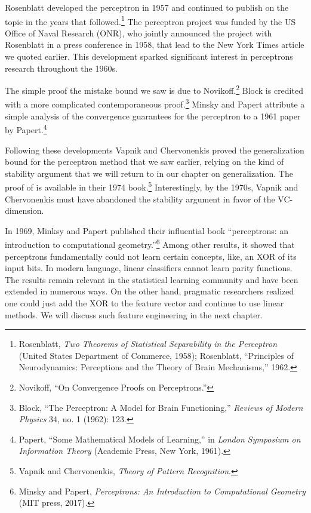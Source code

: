 \documentclass{tufte-book}
\begin{document}
Rosenblatt developed the perceptron in 1957 and continued to publish on
the topic in the years that followed.\footnote{Rosenblatt, \emph{Two
  Theorems of Statistical Separability in the Perceptron} (United States
  Department of Commerce, 1958); Rosenblatt, {``Principles of
  Neurodynamics: Perceptions and the Theory of Brain Mechanisms,''}
  1962.} The perceptron project was funded by the US Office of Naval
Research (ONR), who jointly announced the project with Rosenblatt in a
press conference in 1958, that lead to the New York Times article we
quoted earlier. This development sparked significant interest in
perceptrons research throughout the 1960s.

The simple proof the mistake bound we saw is due to Novikoff.\footnote{Novikoff,
  {``On Convergence Proofs on Perceptrons.''}} Block is credited with a
more complicated contemporaneous proof.\footnote{Block, {``The
  Perceptron: A Model for Brain Functioning,''} \emph{Reviews of Modern
  Physics} 34, no. 1 (1962): 123.} Minsky and Papert attribute a simple
analysis of the convergence guarantees for the perceptron to a 1961
paper by Papert.\footnote{Papert, {``Some Mathematical Models of
  Learning,''} in \emph{London Symposium on Information Theory}
  (Academic Press, New York, 1961).}

Following these developments Vapnik and Chervonenkis proved the
generalization bound for the perceptron method that we saw earlier,
relying on the kind of stability argument that we will return to in our
chapter on generalization. The proof of is available in their 1974
book.\footnote{Vapnik and Chervonenkis, \emph{Theory of Pattern
  Recognition}.} Interestingly, by the 1970s, Vapnik and Chervonenkis
must have abandoned the stability argument in favor of the VC-dimension.

In 1969, Minksy and Papert published their influential book
``perceptrons: an introduction to computational geometry.''\footnote{Minsky
  and Papert, \emph{Perceptrons: An Introduction to Computational
  Geometry} (MIT press, 2017).} Among other results, it showed that
perceptrons fundamentally could not learn certain concepts, like, an XOR
of its input bits. In modern language, linear classifiers cannot learn
parity functions. The results remain relevant in the statistical
learning community and have been extended in numerous ways. On the other
hand, pragmatic researchers realized one could just add the XOR to the
feature vector and continue to use linear methods. We will discuss such
feature engineering in the next chapter.
\end{document}
